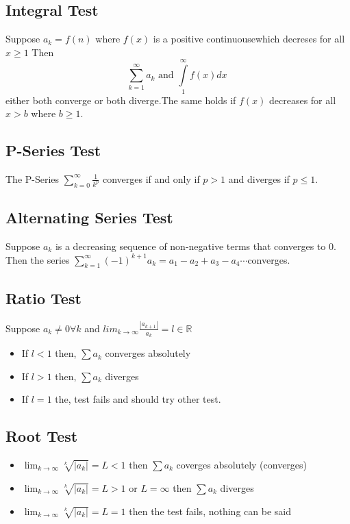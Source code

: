 \documentclass[12pt]{article}
\begin{document}
\subsection{Integral Test}
Suppose $a_k = f(n)$ where $f(x)$ is a positive continuousewhich decreses for all $x \geq 1$ Then
\[
\sum_{k=1}^{\infty} a_k \text{ and } \int\limits_1^\infty f(x) dx
\
\]
either both converge or both diverge.The same holds if $f(x)$ decreases for all $x > b$ where $b \geq 1$.
\subsection{P-Series Test}
The P-Series $\displaystyle\sum_{k=0}^{\infty}\frac{1}{k^p}$ converges if and only if $p>1$ and diverges if $p\le1$.
\subsection{Alternating Series Test}
Suppose ${a_k}$ is a decreasing sequence of non-negative terms that converges to 0. Then the series $\displaystyle\sum_{k=1}^{\infty}(-1)^{k+1}a_k=a_1-a_2+a_3-a_4\cdots$converges.
\subsection{Ratio Test}
Suppose $a_k\ne 0 \forall k$ and $lim_{k\rightarrow\infty}\frac{|a_{k+1}|}{a_k}=l\in\mathbb{R}$
\begin{itemize}
\item If $l<1$ then, $\sum a_k$ converges absolutely
\item If $l>1$ then, $\sum a_k$ diverges
\item If $l=1$ the, test fails and should try other test.
\end{itemize}
\subsection{Root Test}
\begin{itemize}
\item $\lim_{k \to \infty} \sqrt[k]{|a_k|} = L < 1$ then $\sum a_k$ coverges absolutely (converges)
\item $\lim_{k \to \infty} \sqrt[k]{|a_k|} = L > 1$ or $L = \infty$ then $\sum a_k$ diverges
\item $\lim_{k \to \infty} \sqrt[k]{|a_k|} = L = 1$ then the test fails, nothing can be said
\end{itemize}
\end{document}
